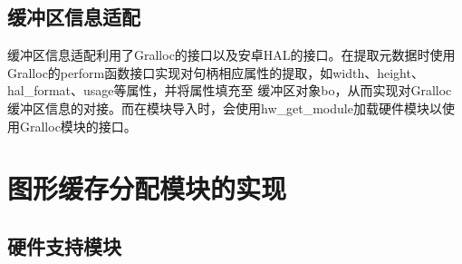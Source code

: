 \subsection{缓冲区信息适配}
缓冲区信息适配利用了Gralloc的接口以及安卓HAL的接口。在提取元数据时使用Gralloc的perform函数接口实现对句柄相应属性的提取，如width、height、hal\_format、usage等属性，并将属性填充至
缓冲区对象bo，从而实现对Gralloc缓冲区信息的对接。而在模块导入时，会使用hw\_get\_module加载硬件模块以使用Gralloc模块的接口。











\section{图形缓存分配模块的实现}

\subsection{硬件支持模块}

